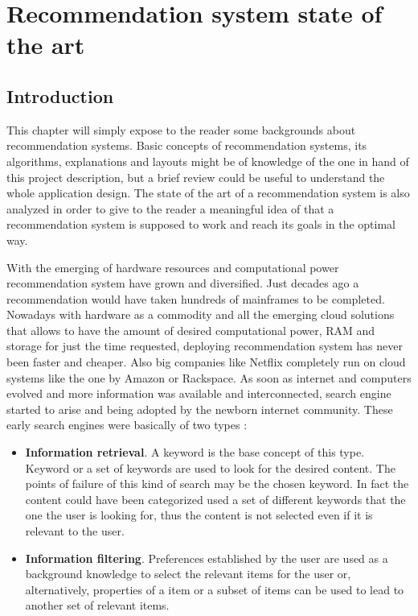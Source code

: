 \chapter{Recommendation system state of the art}
\label{chapter:<recommendation_system_state_of_the_art>}

\section{Introduction}

This chapter will simply expose to the reader some backgrounds about recommendation systems. Basic concepts of recommendation systems, its algorithms, explanations and layouts might be of knowledge of the one in hand of this project description, but a brief review could be useful to understand the whole application design. The state of the art of a recommendation system is also analyzed in order to give to the reader a meaningful idea of that a recommendation system is supposed to work and reach its goals in the optimal way. 

With the emerging of hardware resources and computational power recommendation system have grown and diversified. Just decades ago a recommendation would have taken hundreds of mainframes to be completed. Nowadays with hardware as a commodity and all the emerging cloud solutions that allows to have the amount of desired computational power, RAM and storage for just the time requested, deploying recommendation system has never been faster and cheaper. Also big companies like Netflix completely run on cloud systems like the one by Amazon or Rackspace. 
As soon as internet and computers evolved and more information was available and interconnected, search engine started to arise and being adopted by the newborn internet community. These early search engines were basically of two types \cite{spiegazione_confidenza_raccomandazione}:

\begin{itemize}
\item \textbf{Information retrieval}. A keyword is the base concept of this type. Keyword or a set of keywords are used to look for the desired content. The points of failure of this kind of search may be the chosen keyword. In fact the content could have been categorized used a set of different keywords that the one the user is looking for, thus the content is not selected even if it is relevant to the user.
\item \textbf{Information filtering}. Preferences established by the user are used as a background knowledge to select the relevant items for the user or, alternatively, properties of a item or a subset of items can be used to lead to another set of relevant items.
\end{itemize}

